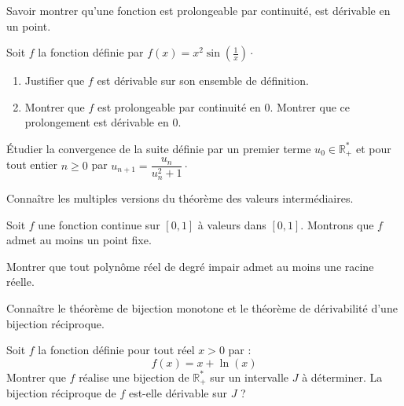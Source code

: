 \documentclass[a4paper,twoside,french,10pt]{VcCours}
\begin{document}
\begin{ptc}{}
	Savoir montrer qu'une fonction est prolongeable par continuité, est dérivable en un point.
\end{ptc}

\medskip

\begin{Exercice}{}\end{Exercice} Soit $f$ la fonction définie par $f(x) = x^2 \sin \left( \frac{1}{x} \right) \cdot$

\begin{enumerate}
\item Justifier que $f$ est dérivable sur son ensemble de définition.
\item Montrer que $f$ est prolongeable par continuité en $0$. Montrer que ce prolongement est dérivable en $0$.
\end{enumerate}

\medskip

\begin{Exercice}{}\end{Exercice} Étudier la convergence de la suite définie par un premier terme $u_0 \in \mathbb{R}_+^*$ et pour tout entier $n \geq 0$ par $u_{n+1} = \dfrac{u_n}{u_n^2+1} \cdot$

\medskip

\begin{ptc}{}
	Connaître les multiples versions du théorème des valeurs intermédiaires.
\end{ptc}

\begin{Exercice}{}\end{Exercice} Soit $f$ une fonction continue sur $[0,1]$ à valeurs dans $[0,1]$. Montrons que $f$ admet au moins un point fixe.

\medskip

\begin{Exercice}{}\end{Exercice} Montrer que tout polynôme réel de degré impair admet au moins une racine réelle.

\medskip

\begin{ptc}{}
	Connaître le théorème de bijection monotone et le théorème de dérivabilité d'une bijection réciproque.
\end{ptc}

\begin{Exercice}{}\end{Exercice} Soit $f$ la fonction définie pour tout réel $x>0$ par :
$$ f(x)= x+ \ln(x)$$
Montrer que $f$ réalise une bijection de $\mathbb{R}_+^{*}$ sur un intervalle $J$ à déterminer. La bijection réciproque de $f$ est-elle dérivable sur $J$ ?
\end{document}
